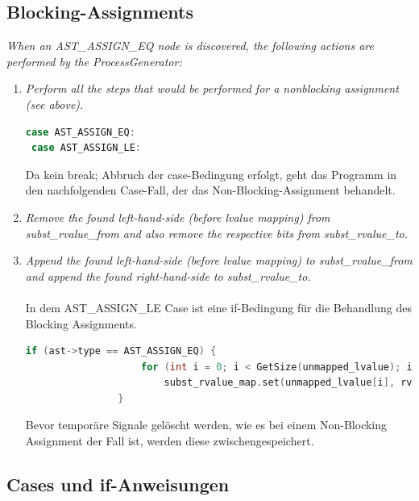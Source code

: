 \documentclass[11pt]{report}
\begin{document}
\subsection{Blocking-Assignments}


\textit{When an AST\_ASSIGN\_EQ node is discovered, the following actions are performed by the ProcessGenerator:}
\begin{enumerate}
  \item \textit{Perform all the steps that would be performed for a nonblocking assignment (see above).}
  \begin{lstlisting}[language=C++]
 case AST_ASSIGN_EQ:
 case AST_ASSIGN_LE:		
  \end{lstlisting}
  Da kein break; Abbruch der case-Bedingung erfolgt, geht das Programm in den nachfolgenden Case-Fall, der das Non-Blocking-Assignment behandelt.
\item \textit{Remove the found left-hand-side (before lvalue mapping) from subst\_rvalue\_from and also remove the respective bits from subst\_rvalue\_to.}



\item \textit{Append the found left-hand-side (before lvalue mapping) to subst\_rvalue\_from and append the found right-hand-side to subst\_rvalue\_to.}
\\
\\
In dem AST\_ASSIGN\_LE Case ist eine if-Bedingung für die Behandlung des Blocking Assignments.

\begin{lstlisting}[language=C++]
if (ast->type == AST_ASSIGN_EQ) {
					for (int i = 0; i < GetSize(unmapped_lvalue); i++)
						subst_rvalue_map.set(unmapped_lvalue[i], rvalue[i]);
				}
\end{lstlisting}

Bevor temporäre Signale gelöscht werden, wie es bei einem Non-Blocking Assignment der Fall ist, werden diese zwischengespeichert.

\end{enumerate}

\subsection{Cases und if-Anweisungen}
\end{document}
